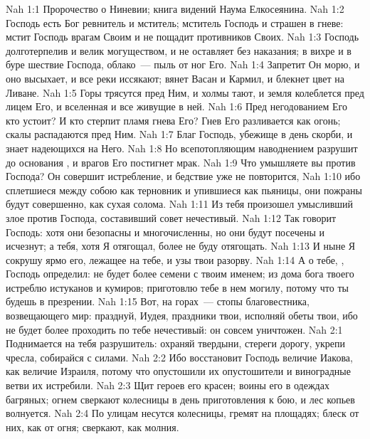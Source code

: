 \vs Nah 1:1 Пророчество о Ниневии; книга видений Наума Елкосеянина.
\rsbpar\vs Nah 1:2 Господь есть Бог ревнитель и мститель; мститель Господь и страшен в гневе: мстит Господь врагам Своим и не пощадит противников Своих.
\vs Nah 1:3 Господь долготерпелив и велик могуществом, и не оставляет без наказания; в вихре и в буре шествие Господа, облако~--- пыль от ног Его.
\vs Nah 1:4 Запретит Он морю, и оно высыхает, и все реки иссякают; вянет Васан и Кармил, и блекнет цвет на Ливане.
\vs Nah 1:5 Горы трясутся пред Ним, и холмы тают, и земля колеблется пред лицем Его, и вселенная и все живущие в ней.
\vs Nah 1:6 Пред негодованием Его кто устоит? И кто стерпит пламя гнева Его? Гнев Его разливается как огонь; скалы распадаются пред Ним.
\vs Nah 1:7 Благ Господь, убежище в день скорби, и знает надеющихся на Него.
\vs Nah 1:8 Но всепотопляющим наводнением разрушит до основания , и врагов Его постигнет мрак.
\vs Nah 1:9 Что умышляете вы против Господа? Он совершит истребление, и бедствие уже не повторится,
\vs Nah 1:10 ибо сплетшиеся между собою как терновник и упившиеся как пьяницы, они пожраны будут совершенно, как сухая солома.
\vs Nah 1:11 Из тебя произошел умысливший злое против Господа, составивший совет нечестивый.
\rsbpar\vs Nah 1:12 Так говорит Господь: хотя они безопасны и многочисленны, но они будут посечены и исчезнут; а тебя, хотя Я отягощал, более не буду отягощать.
\vs Nah 1:13 И ныне Я сокрушу ярмо его, лежащее на тебе, и узы твои разорву.
\vs Nah 1:14 А о тебе, , Господь определил: не будет более семени с твоим именем; из дома бога твоего истреблю истуканов и кумиров; приготовлю тебе в нем могилу, потому что ты будешь в презрении.
\vs Nah 1:15 Вот, на горах~--- стопы благовестника, возвещающего мир: празднуй, Иудея, праздники твои, исполняй обеты твои, ибо не будет более проходить по тебе нечестивый: он совсем уничтожен.
\vs Nah 2:1 Поднимается на тебя разрушитель: охраняй твердыни, стереги дорогу, укрепи чресла, собирайся с силами.
\vs Nah 2:2 Ибо восстановит Господь величие Иакова, как величие Израиля, потому что опустошили их опустошители и виноградные ветви их истребили.
\vs Nah 2:3 Щит героев его красен; воины его в одеждах багряных; огнем сверкают колесницы в день приготовления к бою, и лес копьев волнуется.
\vs Nah 2:4 По улицам несутся колесницы, гремят на площадях; блеск от них, как от огня; сверкают, как молния.
